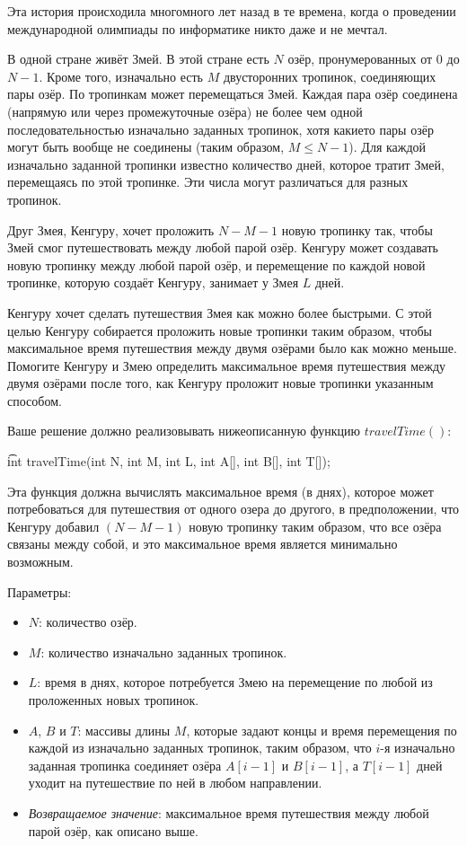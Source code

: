 Эта история происходила много­много лет назад в те времена, когда о проведении
международной олимпиады по информатике никто даже и не мечтал.

В одной стране живёт Змей. В этой стране есть $N$ озёр, пронумерованных от $0$ до
$N -­ 1$. Кроме того, изначально есть $M$ двусторонних тропинок, соединяющих пары
озёр. По тропинкам может перемещаться Змей. Каждая пара озёр соединена
(напрямую или через промежуточные озёра) не более чем одной последовательностью
изначально заданных тропинок, хотя какие­то пары озёр могут быть вообще не
соединены (таким образом, $M \leq N - ­1$). Для каждой изначально заданной тропинки
известно количество дней, которое тратит Змей, перемещаясь по этой тропинке. Эти
числа могут различаться для разных тропинок.

Друг Змея, Кенгуру, хочет проложить $N -­ M ­- 1$ новую тропинку так, чтобы Змей
смог путешествовать между любой парой озёр. Кенгуру может создавать новую
тропинку между любой парой озёр, и перемещение по каждой новой тропинке,
которую создаёт Кенгуру, занимает у Змея $L$ дней.

Кенгуру хочет сделать путешествия Змея как можно более быстрыми. С этой целью
Кенгуру собирается проложить новые тропинки таким образом, чтобы максимальное
время путешествия между двумя озёрами было как можно меньше. Помогите Кенгуру
и Змею определить максимальное время путешествия между двумя озёрами после
того, как Кенгуру проложит новые тропинки указанным способом.

Ваше решение должно реализовывать нижеописанную функцию $travelTime()$:

\t{int travelTime(int N, int M, int L, int A[], int B[], int T[]);}

Эта функция должна вычислять максимальное время (в днях), которое может
потребоваться для путешествия от одного озера до другого, в предположении, что
Кенгуру добавил $(N -­ M -­ 1)$ новую тропинку таким образом, что все озёра связаны
между собой, и это максимальное время является минимально возможным.

Параметры:
\begin{itemize}
\item $N$: количество озёр.
\item $M$: количество изначально заданных тропинок.
\item $L$: время в днях, которое потребуется Змею на перемещение по любой из проложенных новых тропинок.
\item $A$, $B$ и $T$: массивы длины $M$, которые задают концы и время перемещения по каждой из изначально заданных тропинок, таким образом, что $i$-­я изначально заданная тропинка соединяет озёра $A[i­-1]$ и $B[i - 1]$, а $T[i-­1]$ дней уходит на путешествие по ней в любом направлении.
\item \textit{Возвращаемое значение}: максимальное время путешествия между любой парой озёр, как описано выше.
\end{itemize}
